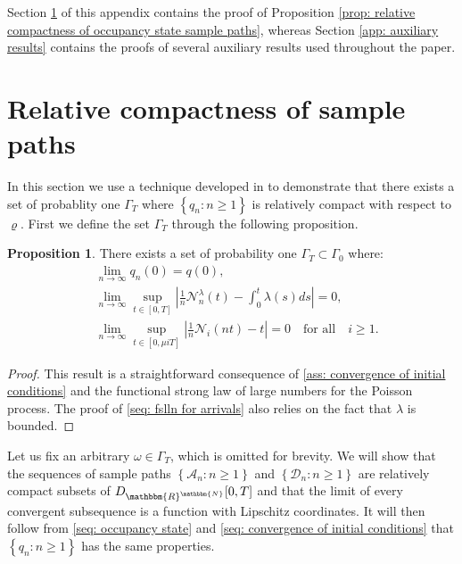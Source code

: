 \documentclass[a4paper, 12pt]{article}
\theoremstyle{definition}
\newtheorem{proposition}[theorem]{Proposition}
\newcommand{\set}[2]{\left\{#1 : #2\right\}}
\newcommand{\calA}{\mathcal{A}}
\newcommand{\calD}{\mathcal{D}}
\newcommand{\calN}{\mathcal{N}}
\newcommand{\N}{\mathbbm{N}}
\newcommand{\R}{\mathbbm{R}}
\begin{document}
\begin{appendices}
	
	Section \ref{app: relative compactness} of this appendix contains the proof of Proposition \ref{prop: relative compactness of occupancy state sample paths}, whereas Section \ref{app: auxiliary results} contains the proofs of several auxiliary results used throughout the paper.
	
	\section{Relative compactness of sample paths}
	\label{app: relative compactness}
	
	In this section we use a technique developed in \cite{bramson1998state} to demonstrate that there exists a set of probablity one $\Gamma_T$ where $\set{q_n}{n \geq 1}$ is relatively compact with respect to $\varrho$. First we define the set $\Gamma_T$ through the following proposition.
	
	\begin{proposition}
		\label{prop: definition of Gamma_T}
		There exists a set of probability one $\Gamma_T \subset \Gamma_0$ where:
		\begin{subequations}
			\begin{align}
				&\lim_{n \to \infty} q_n(0) = q(0), \label{seq: convergence of initial conditions} \\
				&\lim_{n \to \infty} \sup_{t \in [0, T]} \left|\frac{1}{n} \calN_n^\lambda(t) - \int_0^t \lambda(s)ds\right| = 0, \label{seq: fslln for arrivals} \\
				&\lim_{n \to \infty} \sup_{t \in [0, \mu iT]} \left|\frac{1}{n} \calN_i(nt) - t\right| = 0 \quad \text{for all} \quad i \geq 1. \label{seq: fslln for departures}
			\end{align}
		\end{subequations}
	\end{proposition}
	
	\begin{proof}
	This result is a straightforward consequence of \eqref{ass: convergence of initial conditions} and the functional strong law of large numbers for the Poisson process. The proof of \eqref{seq: fslln for arrivals} also relies on the fact that $\lambda$ is bounded.
	\end{proof}
	
	Let us fix an arbitrary $\omega \in \Gamma_T$, which is omitted for brevity. We will show that the sequences of sample paths $\set{\calA_n}{n \geq 1}$ and $\set{\calD_n}{n \geq 1}$ are relatively compact subsets of $D_{\R^\N}[0, T]$ and that the limit of every convergent subsequence is a function with Lipschitz coordinates. It will then follow from \eqref{seq: occupancy state} and \eqref{seq: convergence of initial conditions} that $\set{q_n}{n \geq 1}$ has the same properties.
	

\end{appendices}
\end{document}
